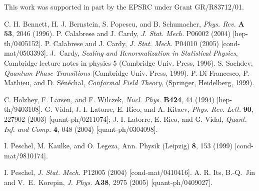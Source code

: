 \documentclass{ws-ijqi}
\begin{document}
This work was supported in part by the EPSRC under Grant GR/R83712/01.


\begin{thebibliography}{0}

C. H. Bennett, H. J. Bernstein, S. Popescu, and B. Schumacher,
{\it Phys. Rev.}  {\bf A 53}, 2046 (1996).
%
 P. Calabrese and J. Cardy, {\it J. Stat. Mech.} 
P06002 (2004) [hep-th/0405152].
%
 P. Calabrese and J. Cardy, {\it J. Stat. Mech.} 
P04010 (2005) [cond-mat/0503393].
%
J.~Cardy, {\it Scaling and Renormalization in Statistical Physics}, Cambridge 
lecture notes in physics 5 (Cambridge Univ. Press, 1996).
%
 S. Sachdev, {\em Quantum Phase Transitions} (Cambridge
Univ. Press, 1999).
%
P. Di Francesco, P. Mathieu, and D. S\'en\'echal, 
{\it Conformal Field Theory}, (Springer, Heidelberg, 1999).

 C. Holzhey, F. Larsen, and F. Wilczek,
{\it Nucl. Phys.}  {\bf B424}, 44 (1994) [hep-th/9403108].
%
G. Vidal, J. I. Latorre, E. Rico, and A. Kitaev,
{\it Phys. Rev. Lett.} {\bf 90}, 227902 (2003) [quant-ph/0211074];
J. I. Latorre, E. Rico, and G. Vidal,
{\it Quant. Inf. and Comp.} {\bf 4}, 048 (2004) [quant-ph/0304098].


 I. Peschel, M. Kaulke, and O. Legeza,
Ann. Physik (Leipzig) {\bf 8}, 153 (1999) [cond-mat/9810174].

%
I. Peschel, {\it J. Stat. Mech.} P12005 (2004) [cond-mat/0410416].
%
A. R. Its, B.-Q.~Jin and V.~E.~Korepin, 
{\it J. Phys.} {\bf A38}, 2975 (2005) [quant-ph/0409027].

\end{thebibliography}
\end{document}
